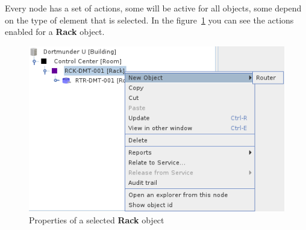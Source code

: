 \documentclass[a4paper]{article}
\begin{document}
	Every node has a set of actions, some will be active for all objects, some depend on the type of element that is selected. In the figure~\ref{fig:navigation_tree_context_menu} you can see the actions enabled for a \textbf{Rack} object. \\
	\begin{figure}[h!]
		\centering
		\includegraphics[width=0.5\linewidth]{img/navigation_tree_context_menu.png}
		\caption{Properties of a selected \textbf{Rack} object}
		\label{fig:navigation_tree_context_menu}
	\end{figure}
\end{document}
